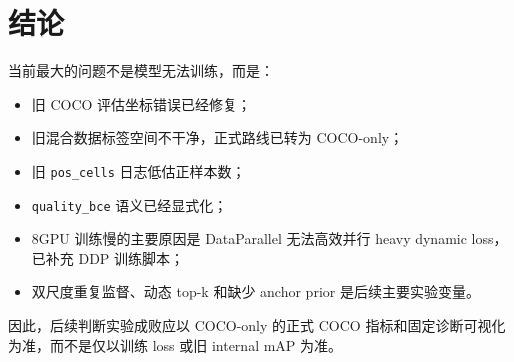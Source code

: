 \documentclass[UTF8]{ctexart}
\begin{document}
\section{结论}

当前最大的问题不是模型无法训练，而是：

\begin{itemize}[leftmargin=2em]
  \item 旧 COCO 评估坐标错误已经修复；
  \item 旧混合数据标签空间不干净，正式路线已转为 COCO-only；
  \item 旧 \texttt{pos\_cells} 日志低估正样本数；
  \item \texttt{quality\_bce} 语义已经显式化；
  \item 8GPU 训练慢的主要原因是 DataParallel 无法高效并行 heavy dynamic loss，已补充 DDP 训练脚本；
  \item 双尺度重复监督、动态 top-k 和缺少 anchor prior 是后续主要实验变量。
\end{itemize}

因此，后续判断实验成败应以 COCO-only 的正式 COCO 指标和固定诊断可视化为准，而不是仅以训练 loss 或旧 internal mAP 为准。
\end{document}
